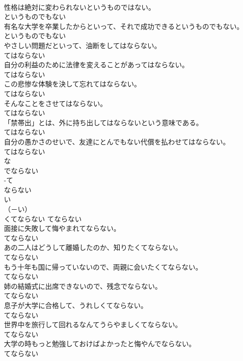 \documentclass[8pt]{extreport}
\begin{document}
\begin{CJK}{UTF8}{min}
\\	性格は絶対に変わられないというものではない。	
\\	というものでもない	
\\	有名な大学を卒業したからといって、それで成功できるというものでもない。	
\\	というものでもない	
\\	やさしい問題だといって、油断をしてはならない。	
\\	てはならない	
\\	自分の利益のために法律を変えることがあってはならない。	
\\	てはならない	
\\	この悲惨な体験を決して忘れてはならない。	
\\	てはならない	
\\	そんなことをさせてはならない。	
\\	てはならない	
\\	「禁帯出」とは、外に持ち出してはならないという意味である。	
\\	てはならない	
\\	自分の愚かさのせいで、友達にとんでもない代償を払わせてはならない。	
\\	てはならない	
\\	な
\\	でならない	
\\	-て
\\	ならない	
\\	い
\\	（－い） 
\\	くてならない	てならない	
\\	面接に失敗して悔やまれてならない。	
\\	てならない	
\\	あの二人はどうして離婚したのか、知りたくてならない。	
\\	てならない	
\\	もう十年も国に帰っていないので、両親に会いたくてならない。	
\\	てならない	
\\	姉の結婚式に出席できないので、残念でならない。	
\\	てならない	
\\	息子が大学に合格して、うれしくてならない。	
\\	てならない	
\\	世界中を旅行して回れるなんてうらやましくてならない。	
\\	てならない	
\\	大学の時もっと勉強しておけばよかったと悔やんでならない。	
\\	てならない	

\end{CJK}
\end{document}
